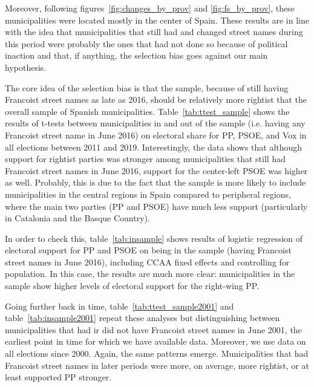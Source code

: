 \documentclass[12pt, titlepage]{article}
\begin{document}
Moreover, following figures~\ref{fig:changes_by_prov} and \ref{fig:fs_by_prov}, these municipalities were located mostly in the center of Spain.
These results are in line with the idea that municipalities that still had and changed street names during this period were probably the ones that had not done so because of political inaction and that, if anything, the selection bias goes against our main hypothesis.

The core idea of the selection bias is that the sample, because of still having Francoist street names as late as 2016, should be relatively more rightist that the overall sample of Spanish municipalities.
Table~\ref{tab:ttest_sample} shows the results of t-tests between municipalities in and out of the sample (i.e. having any Francoist street name in June 2016) on electoral share for PP, PSOE, and Vox in all elections between 2011 and 2019.
Interestingly, the data shows that although support for rightist parties was stronger among municipalities that still had Francoist street names in June 2016, support for the center-left PSOE was higher as well.
Probably, this is due to the fact that the sample is more likely to include municipalities in the central regions in Spain compared to peripheral regions, where the main two parties (PP and PSOE) have much less support (particularly in Catalonia and the Basque Country).



In order to check this, table~\ref{tab:insample} shows results of logistic regression of electoral support for PP and PSOE on being in the sample (having Francoist street names in June 2016), including CCAA fixed effects and controlling for population.
In this case, the results are much more clear: municipalities in the sample show higher levels of electoral support for the right-wing PP.



Going further back in time, table~\ref{tab:ttest_sample2001} and table~\ref{tab:insample2001} repeat these analyses but distinguishing between municipalities that had ir did not have Francoist street names in June 2001, the earliest point in time for which we have available data.
Moreover, we use data on all elections since 2000.
Again, the same patterns emerge.
Municipalities that had Francoist street names in later periods were more, on average, more rightist, or at least supported PP stronger.



\end{document}
